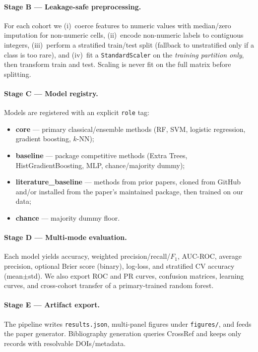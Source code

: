 \documentclass[10pt,journal]{IEEEtran}
\begin{document}
\paragraph{Stage B --- Leakage-safe preprocessing.}
For each cohort we (i)~coerce features to numeric values with median/zero imputation for
non-numeric cells, (ii)~encode non-numeric labels to contiguous integers, (iii)~perform a
stratified train/test split (fallback to unstratified only if a class is too rare), and
(iv)~fit a \texttt{StandardScaler} on the \emph{training partition only}, then transform
train and test. Scaling is never fit on the full matrix before splitting.

\paragraph{Stage C --- Model registry.}
Models are registered with an explicit \texttt{role} tag:
\begin{itemize}
\item \textbf{core} --- primary classical/ensemble methods (RF, SVM, logistic regression,
gradient boosting, $k$-NN);
\item \textbf{baseline} --- package competitive methods (Extra Trees, HistGradientBoosting,
MLP, chance/majority dummy);
\item \textbf{literature\_baseline} --- methods from prior papers, cloned from GitHub and/or
installed from the paper's maintained package, then trained on our data;
\item \textbf{chance} --- majority dummy floor.
\end{itemize}

\paragraph{Stage D --- Multi-mode evaluation.}
Each model yields accuracy, weighted precision/recall/$F_1$, AUC-ROC, average precision,
optional Brier score (binary), log-loss, and stratified CV accuracy (mean$\pm$std). We also
export ROC and PR curves, confusion matrices, learning curves, and cross-cohort transfer of a
primary-trained random forest.

\paragraph{Stage E --- Artifact export.}
The pipeline writes \texttt{results.json}, multi-panel figures under \texttt{figures/}, and
feeds the paper generator. Bibliography generation queries CrossRef and keeps only records
with resolvable DOIs/metadata.
\end{document}
